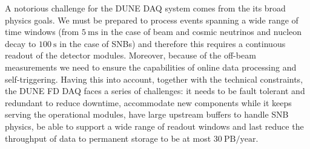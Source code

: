 A notorious challenge for the DUNE DAQ system comes from the its broad physics goals. We must be prepared to process events spanning a wide range of time windows (from $5 \ \mathrm{ms}$ in the case of beam and cosmic neutrinos and nucleon decay to $100 \ \mathrm{s}$ in the case of SNBs) and therefore this requires a continuous readout of the detector modules. Moreover, because of the off-beam measurements we need to ensure the capabilities of online data processing and self-triggering. Having this into account, together with the technical constraints, the DUNE FD DAQ faces a series of challenges: it needs to be fault tolerant and redundant to reduce downtime, accommodate new components while it keeps serving the operational modules, have large upstream buffers to handle SNB physics, be able to support a wide range of readout windows and last reduce the throughput of data to permanent storage to be at most $30 \ \mathrm{PB/year}$.